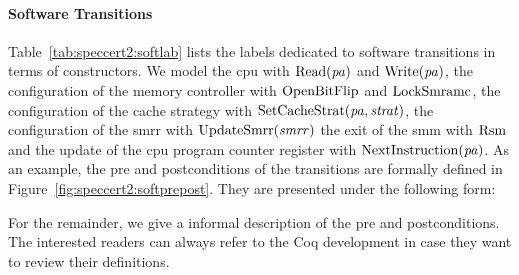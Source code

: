 \paragraph{Software Transitions}
%
Table~\ref{tab:speccert2:softlab} lists the labels dedicated to software
transitions in terms of constructors.
%
We model the \ac{cpu} \IOs with \( \func{Read}(\var{pa}) \) and
\( \func{Write}(\var{pa}) \), the configuration of the memory controller with
\( \func{OpenBitFlip} \) and \( \func{LockSmramc} \), the configuration of the
cache strategy with \( \func{SetCacheStrat}(\var{pa}, \var{strat}) \), the
configuration of the \ac{smrr} with \( \func{UpdateSmrr}(\var{smrr}) \) the exit
of the \ac{smm} with $\func{Rsm}$ and the update of the \ac{cpu} program counter
register with $\func{NextInstruction}(\var{pa})$.
%
As an example, the pre and postconditions of the  transitions are
formally defined in Figure~\ref{fig:speccert2:softprepost}.
%
They are presented under the following form:
%
\begin{prooftree}
\end{prooftree}
%
For the remainder, we give a informal description of the pre and postconditions.
%
The interested readers can always refer to the Coq development in case they want
to review their definitions.

